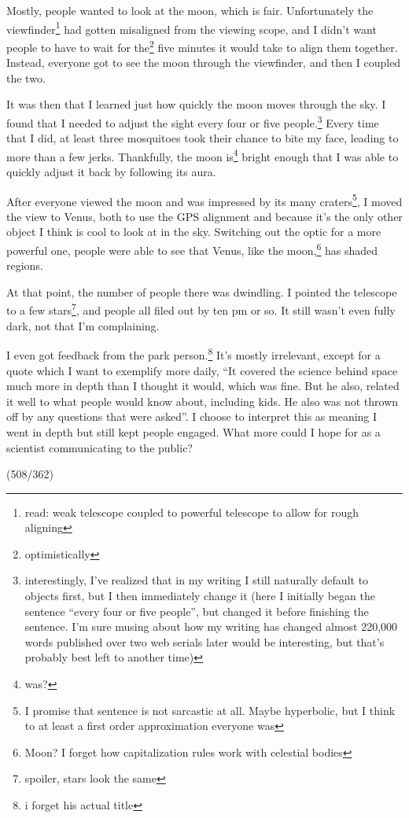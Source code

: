 \documentclass[12pt]{article}[titlepage]
\newcommand{\say}[1]{``#1''}
\newcommand{\1}{\={a}}
\newcommand{\2}{\={e}}
\newcommand{\3}{\={\i}}
\newcommand{\4}{\=o}
\newcommand{\5}{\=u}
\newcommand{\6}{\={A}}
\renewcommand{\,}{\textsuperscript{,}}
\begin{document}
Mostly, people wanted to look at the moon, which is fair.
Unfortunately the viewfinder\footnote{read: weak telescope coupled to powerful telescope to allow for rough aligning} had gotten misaligned from the viewing scope, and I didn't want people to have to wait for the\footnote{optimistically} five minutes it would take to align them together.
Instead, everyone got to see the moon through the viewfinder, and then I coupled the two.

It was then that I learned just how quickly the moon moves through the sky.
I found that I needed to adjust the sight every four or five people.\footnote{interestingly, I've realized that in my writing I still naturally default to objects first, but I then immediately change it (here I initially began the sentence \say{every four or five people}, but changed it before finishing the sentence. I'm sure musing about how my writing has changed almost 220,000 words published over two web serials later would be interesting, but that's probably best left to another time)}
Every time that I did, at least three mosquitoes took their chance to bite my face, leading to more than a few jerks.
Thankfully, the moon is\footnote{was?} bright enough that I was able to quickly adjust it back by following its aura.

After everyone viewed the moon and was impressed by its many craters\footnote{I promise that sentence is not sarcastic at all. Maybe hyperbolic, but I think to at least a first order approximation everyone was}, I moved the view to Venus, both to use the GPS alignment and because it's the only other object I think is cool to look at in the sky.
Switching out the optic for a more powerful one, people were able to see that Venus, like the moon,\footnote{Moon? I forget how capitalization rules work with celestial bodies} has shaded regions.

At that point, the number of people there was dwindling.
I pointed the telescope to a few stars\footnote{spoiler, stars look the same}, and people all filed out by ten pm or so.
It still wasn't even fully dark, not that I'm complaining.

I even got feedback from the park person.\footnote{i forget his actual title}
It's mostly irrelevant, except for a quote which I want to exemplify more daily, \say{It covered the science behind space much more in depth than I thought it would, which was fine. But he also, related it well to what people would know about, including kids. He also was not thrown off by any questions that were asked}.
I choose to interpret this as meaning I went in depth but still kept people engaged.
What more could I hope for as a scientist communicating to the public?

(508/362)
\end{document}
